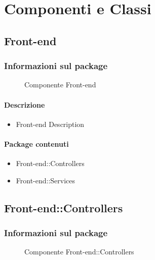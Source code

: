 \section{Componenti e Classi}
  \subsection{Front-end}
  \subsubsection{Informazioni sul package} 

    \begin{figure}[H] 
      \begin{center} 
        \caption{Componente Front-end}
      \end{center}  
    \end{figure} 

  \paragraph{Descrizione} 
    \begin{itemize}
    \item[] Front-end Description
    \end{itemize} 
    \paragraph{Package contenuti} 
    \begin{itemize}
        \item Front-end::Controllers
        \item Front-end::Services
    \end{itemize}
  \subsection{Front-end::Controllers}
  \subsubsection{Informazioni sul package} 

    \begin{figure}[H] 
      \begin{center} 
        \caption{Componente Front-end::Controllers}
      \end{center}  
    \end{figure} 

